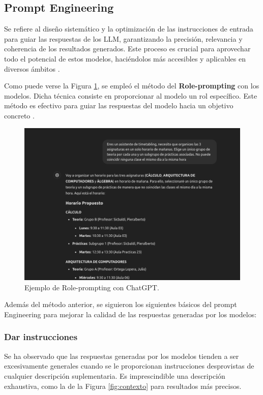 \subsection{Prompt Engineering}

Se refiere al diseño sistemático y la optimización de las instrucciones de entrada para guiar las respuestas de los LLM, garantizando la precisión, relevancia y coherencia de los resultados generados. Este proceso es crucial para aprovechar todo el potencial de estos modelos, haciéndolos más accesibles y aplicables en diversos ámbitos \cite{chen2023unleashing}.\newline

Como puede verse la Figura \ref{fig:role_prompt}, se empleó el método del \textbf{Role-prompting} con los modelos. Dicha técnica consiste en proporcionar al modelo un rol específico. Este método es efectivo para guiar las respuestas del modelo hacia un objetivo concreto \cite{Zhang_2023}.\newline

\begin{figure}[H]
    \centering
    \includegraphics[width=1\textwidth]{./imagenes/Role_prompt.png}
    \caption{Ejemplo de Role-prompting con ChatGPT.}
    \label{fig:role_prompt}
\end{figure}

Además del método anterior, se siguieron los siguientes básicos del prompt Engineering \cite{Zhang_2023} para mejorar la calidad de las respuestas generadas por los modelos:

\subsubsection*{Dar instrucciones}
Se ha observado que las respuestas generadas por los modelos tienden a ser excesivamente generales cuando se le proporcionan instrucciones desprovistas de cualquier descripción suplementaria. Es imprescindible una descripción exhaustiva, como la de la Figura \ref{fig:contexto} para resultados más precisos.

